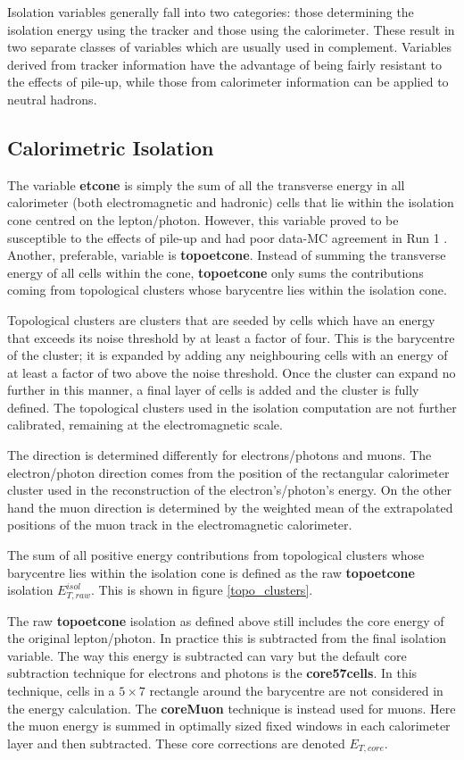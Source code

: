 Isolation variables generally fall into two categories: those determining the isolation energy using the tracker and those using the calorimeter. These result in two separate classes of variables which are usually used in complement. Variables derived from tracker information have the advantage of being fairly resistant to the effects of pile-up, while those from calorimeter information can be applied to neutral hadrons.
\subsection{Calorimetric Isolation}
\label{calorimetric_isolation}
The variable \textbf{etcone} is simply the sum of all the transverse energy in all calorimeter (both electromagnetic and hadronic) cells that lie within the isolation cone centred on the lepton/photon. However, this variable proved to be susceptible to the effects of pile-up and had poor data-MC agreement in Run 1 \cite{laplace}. Another, preferable, variable is \textbf{topoetcone}. Instead of summing the transverse energy of all cells within the cone, \textbf{topoetcone} only sums the contributions coming from topological clusters whose barycentre lies within the isolation cone.

Topological clusters \cite{laplace_21} are clusters that are seeded by cells which have an energy that exceeds its noise threshold by at least a factor of four. This is the barycentre of the cluster; it is expanded by adding any neighbouring cells with an energy of at least a factor of two above the noise threshold. Once the cluster can expand no further in this manner, a final layer of cells is added and the cluster is fully defined. The topological clusters used in the isolation computation are not further calibrated, remaining at the electromagnetic scale.

The direction is determined differently for electrons/photons and muons. The electron/photon direction comes from the position of the rectangular calorimeter cluster used in the reconstruction of the electron's/photon's energy. On the other hand the muon direction is determined by the weighted mean of the extrapolated positions of the muon track in the electromagnetic calorimeter.

The sum of all positive energy contributions from topological clusters whose barycentre lies within the isolation cone is defined as the raw \textbf{topoetcone} isolation $E_{T, raw}^{isol}$. This is shown in figure \ref{topo_clusters}.

The raw \textbf{topoetcone} isolation as defined above still includes the core energy of the original lepton/photon. In practice this is subtracted from the final isolation variable. The way this energy is subtracted can vary but the default core subtraction technique for electrons and photons is the \textbf{core57cells}. In this technique, cells in a $5 \times 7$ rectangle around the barycentre are not considered in the energy calculation. The \textbf{coreMuon} technique is instead used for muons. Here the muon energy is summed in optimally sized fixed windows in each calorimeter layer and then subtracted. These core corrections are denoted $E_{T, core}$.

